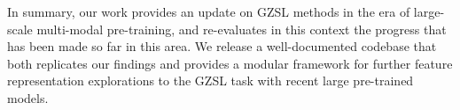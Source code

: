 In summary, our work provides an update on GZSL methods in the era of large-scale multi-modal pre-training, and re-evaluates in this context the progress that has been made so far in this area.
We release a well-documented codebase that both replicates our findings and provides a modular framework for further feature representation explorations to the GZSL task with recent large pre-trained models.
\begin{figure}[h!]
\end{figure}
